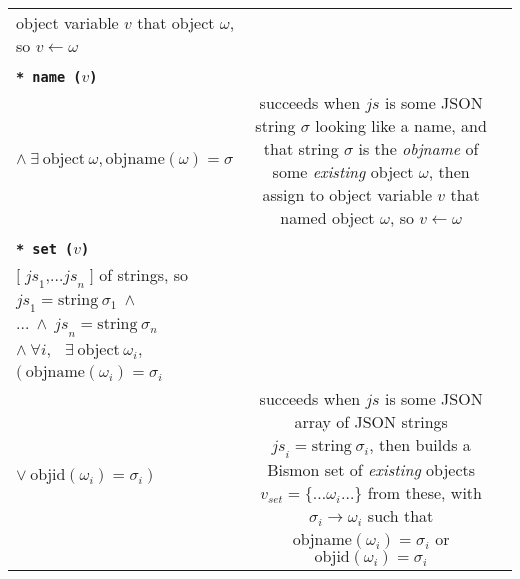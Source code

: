 \begin{table}[!htbp]
\begin{relsize}{-1.2}
\begin{center}
\begin{tabular}{lcp{5.7cm}}
      object variable $v$ that object $\omega$, so  $v \leftarrow \omega$ \\
            \rule{0pt}{1ex} \\
      \texttt{\textbf{* name ($v$)}} &
      \begin{minipage}[t]{4.5cm}
        $\mathit{js} \equiv \mathrm{some ~ JSON ~ string}~ \sigma$\\
        \hspace*{0.5em} $ \wedge ~ \exists ~ \mathrm{object} ~ \omega, \mathrm{objname}(\omega) = \sigma$ 
      \end{minipage}
      &
      succeeds when $\mathit{js}$ is some JSON string $\sigma$ looking like a name, and that string $\sigma$ is the \emph{objname} of some \emph{existing} object $\omega$, then assign to
      object variable $v$ that named object $\omega$, so  $v \leftarrow \omega$ \\
            \rule{0pt}{1ex} \\
      \texttt{\textbf{* set ($v$)}} &
      \begin{minipage}[t]{4.5cm}
        $\mathit{js} \equiv \mathrm{some ~ JSON ~ array}$ \\
        \hspace*{2em}  $ \mathtt{\textbf{[}} \; \mathit{js}_1  \mathtt{\textbf{,}} \ldots  \mathit{js}_n \; \mathtt{\textbf{]}} $ of strings, so \\
        \hspace*{1em} $\mathit{js}_1 = \mathrm{string} ~ \sigma_1 ~ \wedge$ \\
        \hspace*{2em} $ \ldots ~ \wedge ~ \mathit{js}_n = \mathrm{string} ~ \sigma_n$ \\
        \hspace*{0.5em} $ \wedge ~ \forall i, ~ \; ~ \exists ~ \mathrm{object} ~ \omega_i,$ \\
        \hspace*{1em} $( ~ \mathrm{objname}(\omega_i) = \sigma_i $ \\
        \hspace*{1.8em} $ \vee ~ \mathrm{objid} (\omega_i) = \sigma_i ~ )$ 
      \end{minipage}
      &
      succeeds when $\mathit{js}$ is some JSON array of JSON strings
      $\mathit{js}_i = \mathrm{string} ~ \sigma_i$,
      then builds a Bismon set of \emph{existing} objects $ v_{set} = \{ \ldots \omega_i \ldots \} $ from these, with
      $\sigma_i \rightarrow \omega_i$ such that $\mathrm{objname}(\omega_i) = \sigma_i$ or  $\mathrm{objid}(\omega_i) = \sigma_i$  \\

\end{tabular}
\end{center}
\end{relsize}
\end{table}
